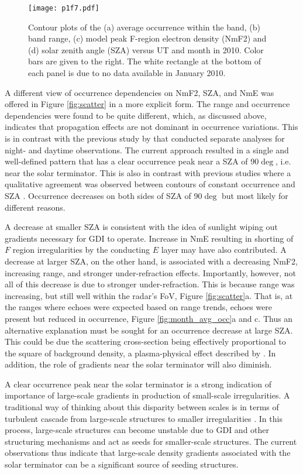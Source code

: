 \begin{figure}
\texttt{[image: p1f7.pdf]}
\caption{Contour plots of the (a) average occurrence within the band, (b) band range, (c) model peak F-region electron density (NmF2) and (d) solar zenith angle (SZA) versus UT and month in 2010. Color bars are given to the right. The white rectangle at the bottom of each panel is due to no data available in January 2010.}
\label{fig:month_ut}
\end{figure}

A different view of occurrence dependencies on NmF2, SZA, and NmE was offered in Figure \ref{fig:scatter} in a more explicit form. The range and occurrence dependencies were found to be quite different, which, as discussed above, indicates that propagation effects are not dominant in occurrence variations. This is in contrast with the previous study by \citet{Kane2012} that conducted separate analyses for night- and daytime observations. The current approach resulted in a single and well-defined pattern that has a clear occurrence peak near a SZA of 90\(\deg\), i.e. near the solar terminator. This is also in contrast with previous studies where a qualitative agreement was observed between contours of constant occurrence and SZA \citep{Kane2012,Ghezelbash2014b}. Occurrence decreases on both sides of SZA of 90\(\deg\) but most likely for different reasons.

A decrease at smaller SZA is consistent with the idea of sunlight wiping out gradients necessary for GDI to operate. Increase in NmE resulting in shorting of \(F\) region irregularities by the conducting \(E\) layer may have also contributed. A decrease at larger SZA, on the other hand, is associated with a decreasing NmF2, increasing range, and stronger under-refraction effects. Importantly, however, not all of this decrease is due to stronger under-refraction. This is because range was increasing, but still well within the radar's FoV, Figure \ref{fig:scatter}a. That is, at the ranges where echoes were expected based on range trends, echoes were present but reduced in occurrence, Figure \ref{fig:month_avg_occ}a and c. Thus an alternative explanation must be sought for an occurrence decrease at large SZA. This could be due the scattering cross-section being effectively proportional to the square of background density, a plasma-physical effect described by \citet{Makarevich2014b}. In addition, the role of gradients near the solar terminator will also diminish.

A clear occurrence peak near the solar terminator is a strong indication of importance of large-scale gradients in production of small-scale irregularities. A traditional way of thinking about this disparity between scales is in terms of turbulent cascade from large-scale structures to smaller irregularities \citep{Tsunoda1988}. In this process, large-scale structures can become unstable due to GDI and other structuring mechanisms and act as seeds for smaller-scale structures. The current observations thus indicate that large-scale density gradients associated with the solar terminator can be a significant source of seeding structures.

